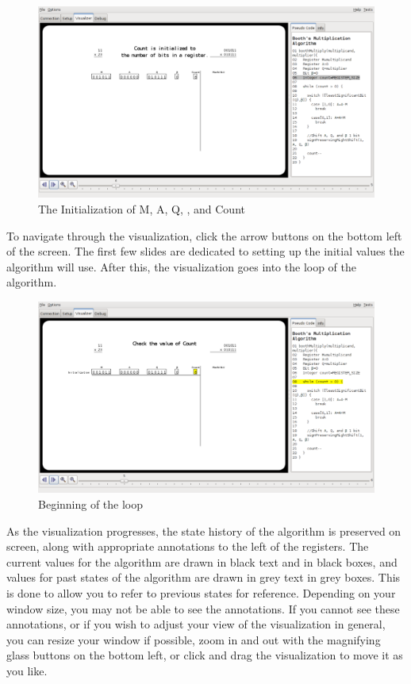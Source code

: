 \documentclass{article}
\begin{document}
\begin{figure}[h]
\centering
\includegraphics[scale=0.3]{initreg.pdf}
\caption{The Initialization of M, A, Q, \beta, and Count}%
\end{figure}

To navigate through the visualization, click the arrow buttons on the bottom left of the screen.
The first few slides are dedicated to setting up the initial values the algorithm will use.
After this, the visualization goes into the loop of the algorithm.

\pagebreak
\begin{figure}[h]
\centering
\includegraphics[scale=0.3]{looptop.pdf}
\caption{Beginning of the loop}
\end{figure}

As the visualization progresses, the state history of the algorithm is preserved on screen, along with appropriate annotations to the left of the registers.
The current values for the algorithm are drawn in black text and in black boxes, and values for past states of the algorithm are drawn in grey text in grey boxes.
This is done to allow you to refer to previous states for reference.
Depending on your window size, you may not be able to see the annotations.
If you cannot see these annotations, or if you wish to adjust your view of the visualization in general, you can resize your window if possible, zoom in and out with the magnifying glass buttons on the bottom left, or click and drag the visualization to move it as you like.
\end{document}
